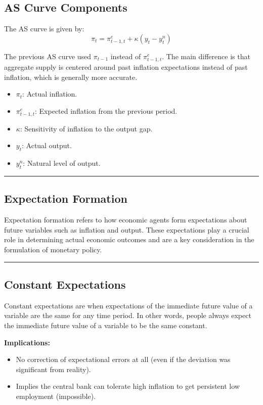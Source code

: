 \documentclass{article}
\begin{document}
\subsection{AS Curve Components}

The AS curve is given by:
\[ \pi_t = \pi^e_{t-1,t} + \kappa (y_t - y^n_t) \]

The previous AS curve used \(\pi_{t-1}\) instead of \(\pi^e_{t-1,t}\). The main difference is that aggregate supply is centered around past inflation expectations instead of past inflation, which is generally more accurate.

\begin{itemize}
    \item \(\pi_t\): Actual inflation.
    \item \(\pi^e_{t-1,t}\): Expected inflation from the previous period.
    \item \(\kappa\): Sensitivity of inflation to the output gap.
    \item \(y_t\): Actual output.
    \item \(y^n_t\): Natural level of output.
\end{itemize}

\noindent\rule{\linewidth}{0.5pt}

\subsection{Expectation Formation}

Expectation formation refers to how economic agents form expectations about future variables such as inflation and output. These expectations play a crucial role in determining actual economic outcomes and are a key consideration in the formulation of monetary policy.

\noindent\rule{\linewidth}{0.5pt}

\subsection{Constant Expectations}

Constant expectations are when expectations of the immediate future value of a variable are the same for any time period. In other words, people always expect the immediate future value of a variable to be the same constant.

\textbf{Implications:}
\begin{itemize}
    \item No correction of expectational errors at all (even if the deviation was significant from reality).
    \item Implies the central bank can tolerate high inflation to get persistent low employment (impossible).
\end{itemize}
\end{document}
